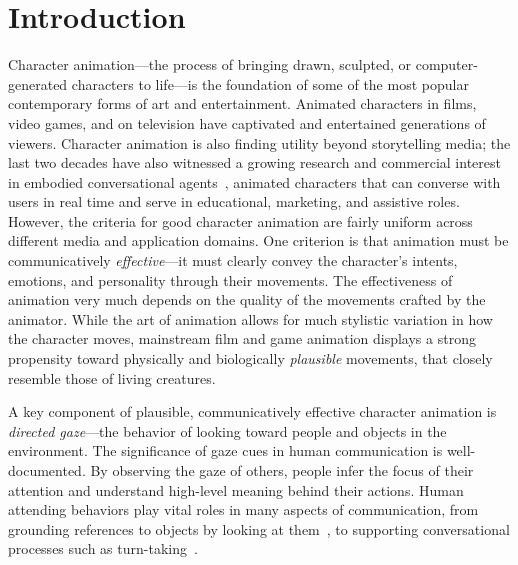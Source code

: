 \pagestyle{deposit}

\chapter{Introduction}

Character animation---the process of bringing drawn, sculpted, or computer-generated characters to life---is the foundation of some of the most popular contemporary forms of art and entertainment. Animated characters in films, video games, and on television have captivated and entertained generations of viewers. Character animation is also finding utility beyond storytelling media; the last two decades have also witnessed a growing research and commercial interest in embodied conversational agents~\citep{cassell2000embodied}, animated characters that can converse with users in real time and serve in educational, marketing, and assistive roles.
However, the criteria for good character animation are fairly uniform across different media and application domains. One criterion is that animation must be communicatively \emph{effective}---it must clearly convey the character's intents, emotions, and personality through their movements.
The effectiveness of animation very much depends on the quality of the movements crafted by the animator. While the art of animation allows for much stylistic variation in how the character moves, mainstream film and game animation displays a strong propensity toward physically and biologically \emph{plausible} movements, that closely resemble those of living creatures.

A key component of plausible, communicatively effective character animation is \emph{directed gaze}---the behavior of looking toward people and objects in the environment.
The significance of gaze cues in human communication is well-documented. By observing the gaze of others, people infer the focus of their attention and understand high-level meaning behind their actions. Human attending behaviors play vital roles in many aspects of communication, from grounding references to objects by looking at them~\citep{hanna2007speakers,preissler2005role}, to supporting conversational processes such as turn-taking~\citep{wiemann1975turn}.

